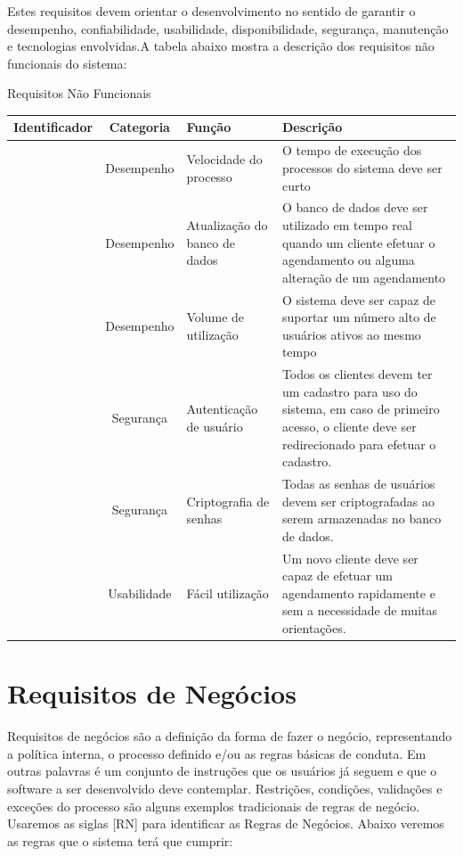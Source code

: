 \documentclass[
	12pt,				%
	openright,			%
	twoside,			%
	a4paper,			%
	english,			%
	french,				%
	spanish,			%
	brazil				%
	]{abntex2}
\begin{document}
Estes requisitos devem orientar o desenvolvimento no sentido de garantir o
desempenho, confiabilidade, usabilidade, disponibilidade, segurança, manutenção
e tecnologias envolvidas.A tabela abaixo mostra a descrição dos requisitos não funcionais do sistema:

\begin{quadro}[htb]
	\centering
	\caption{\label{quadro_RNF}Requisitos Não Funcionais}
	\begin{tabular}{|c|c|>{\centering\arraybackslash}p{4cm}|>{\centering\arraybackslash}p{6cm}|}
		\hline
		\textbf{Identificador} & \textbf{Categoria} & \textbf{Função} & \textbf{Descrição}\\ \hline
		[RNF01] & Desempenho  & Velocidade do processo        & O tempo de execução dos processos do sistema deve ser curto \\ \hline
		[RNF02] & Desempenho  & Atualização do banco de dados & O banco de dados deve ser utilizado em tempo real quando um cliente efetuar o agendamento ou alguma alteração de um agendamento \\ \hline
		[RNF03] & Desempenho  & Volume de utilização          & O sistema deve ser capaz de suportar um número alto de usuários ativos ao mesmo tempo \\ \hline
		[RNF04] & Segurança   & Autenticação de usuário       & Todos os clientes devem ter um cadastro para uso do sistema, em caso de primeiro acesso, o cliente deve ser redirecionado para efetuar o cadastro. \\ \hline
		[RNF05] & Segurança   & Criptografia de senhas        & Todas as senhas de usuários devem ser criptografadas ao serem armazenadas no banco de dados. \\ \hline
		[RNF06] & Usabilidade & Fácil utilização              & Um novo cliente deve ser capaz de efetuar um agendamento rapidamente e sem a necessidade de muitas orientações. \\ \hline
	\end{tabular}
\end{quadro}

\section{Requisitos de Negócios}
Requisitos de negócios são a definição da forma de fazer o negócio,
representando a política interna, o processo definido e/ou as regras básicas de
conduta. Em outras palavras é um conjunto de instruções que os usuários já
seguem e que o software a ser desenvolvido deve contemplar. Restrições,
condições, validações e exceções do processo são alguns exemplos tradicionais de
regras de negócio. Usaremos as siglas [RN] para identificar as Regras de
Negócios. Abaixo veremos as regras que o sistema terá que cumprir:
\end{document}
